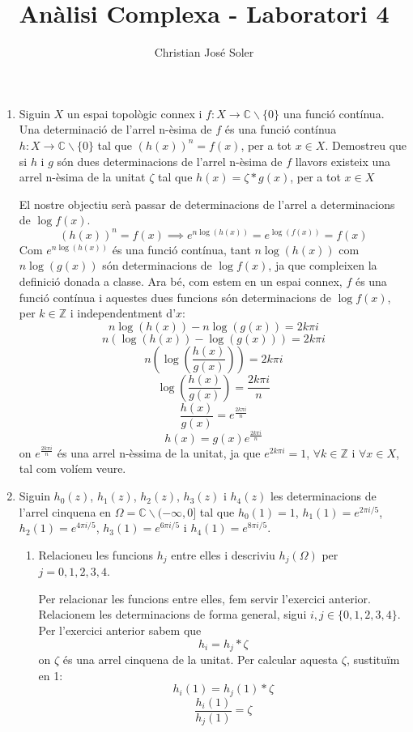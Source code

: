 \documentclass[10pt,a4paper]{article}
\author{Christian José Soler}
\title{Anàlisi Complexa - Laboratori 4}
\begin{document}
\maketitle

\begin{enumerate}
\item Siguin $X$ un espai topològic connex i $f:X \rightarrow \mathbb{C} \backslash \{0\}$ una funció contínua. Una determinació de l’arrel n-èsima de $f$ és una funció contínua $h:X \rightarrow \mathbb{C} \backslash \{0\}$ tal que $(h(x))^{n} = f(x)$, per a tot $x\in X$.
Demostreu que si $h$ i $g$ són dues determinacions de l’arrel n-èsima de $f$ llavors existeix una arrel n-èsima de la unitat $\zeta$ tal que $h(x) = \zeta * g(x)$, per a tot $x\in X$
	\begin{framed}
	El nostre objectiu serà passar de determinacions de l'arrel a determinacions de $\log f(x)$.
	$$(h(x))^{n} = f(x) \implies e^{n\log(h(x))} = e^{\log(f(x))} = f(x)$$
	Com $e^{n\log(h(x))}$ és una funció contínua, tant $n\log(h(x))$ com $n\log(g(x))$ són determinacions de $\log f(x)$, ja que compleixen la definició donada a classe. Ara bé, com estem en un espai connex, $f$ és una funció contínua i aquestes dues funcions són determinacions de $\log f(x)$, per $k\in\mathbb{Z}$ i independentment d'$x$:
	$$n\log(h(x)) - n\log(g(x)) = 2k\pi i$$
	$$n(\log(h(x)) - \log(g(x))) = 2k\pi i$$
	$$n\left(\log\left(\frac{h(x)}{g(x)}\right)\right) = 2k\pi i$$
	$$\log\left(\frac{h(x)}{g(x)}\right) = \frac{2k\pi i}{n}$$
	$$\frac{h(x)}{g(x)} = e^{\frac{2k\pi i}{n}}$$
	$$h(x) = g(x)e^{\frac{2k\pi i}{n}}$$
	on $e^{\frac{2k\pi i}{n}}$ és una arrel n-èssima de la unitat, ja que $e^{2k\pi i} = 1$, $\forall k\in\mathbb{Z}$ i $\forall x\in X$, tal com volíem veure.
	\end{framed}
\newpage
\item Siguin $h_{0}(z)$, $h_{1}(z)$, $h_{2}(z)$, $h_{3}(z)$ i $h_{4}(z)$ les determinacions de l'arrel cinquena en $\Omega = \mathbb{C} \backslash (-\infty,0]$ tal que $h_{0}(1)=1$, $h_{1}(1) = e^{2\pi i/5}$, $h_{2}(1) = e^{4\pi i/5}$, $h_{3}(1) = e^{6\pi i/5}$ i $h_{4}(1) = e^{8\pi i/5}$.
	\begin{enumerate}
	\item Relacioneu les funcions $h_{j}$ entre elles i descriviu $h_{j}(\Omega)$ per $j=0,1,2,3,4$.
	\begin{framed}
	Per relacionar les funcions entre elles, fem servir l'exercici anterior. Relacionem les determinacions de forma general, sigui $i,j\in\{0,1,2,3,4\}$. Per l'exercici anterior sabem que
	$$h_{i} = h_{j} * \zeta$$
	on $\zeta$ és una arrel cinquena de la unitat. Per calcular aquesta $\zeta$, sustituïm en 1:
	$$h_{i}(1) = h_{j}(1) * \zeta$$
	$$\frac{h_{i}(1)}{h_{j}(1)} = \zeta$$


\end{framed}
\end{enumerate}
\end{enumerate}
\end{document}
